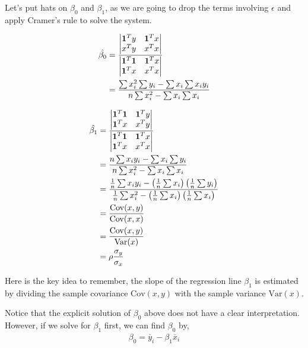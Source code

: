 \documentclass{amsart}
\theoremstyle{plain}
\numberwithin{equation}{section}
\begin{document}
Let's put hats on $\beta_0$ and 
$\beta_1$, as we are going to drop the 
terms involving $\epsilon$ and apply 
Cramer's rule to solve the system.

\begin{align*}
\hat{\beta_0} &= \frac{
\left|
\begin{matrix}
{\bf 1}^Ty & {\bf 1}^Tx\\
x^Ty & x^Tx
\end{matrix}
\right|}
{
\left|
\begin{matrix}
{\bf 1}^T{\bf 1} & {\bf 1}^Tx\\
{\bf 1}^Tx & x^Tx
\end{matrix}
\right|}\\
&=\frac{\sum{x_i^2}\sum{y_i}-\sum{x_i}\sum{x_i y_i}}{n\sum{x_i^2}-\sum{x_i}\sum{x_i}}
\end{align*}

\begin{align*}
\hat{\beta_1} &= \frac{
\left|
\begin{matrix}
{\bf 1}^T{\bf 1} & {\bf 1}^Ty\\
{\bf 1}^Tx & x^Ty
\end{matrix}
\right|}
{
\left|
\begin{matrix}
{\bf 1}^T{\bf 1} & {\bf 1}^Tx\\
{\bf 1}^Tx & x^Tx
\end{matrix}
\right|}\\ 
& = \frac{n \sum{x_i y_i} - \sum{x_i}\sum{y_i}}
{n\sum{x_i^2}-\sum{x_i}\sum{x_i}}\\
& = \frac{ \frac{1}{n}\sum{x_i y_i} - 
\left(\frac{1}{n}\sum{x_i}\right)\left(\frac{1}{n}\sum{y_i}\right)}
{\frac{1}{n}\sum{x_i^2}-
\left(\frac{1}{n}\sum{x_i}\right)\left(\frac{1}{n}\sum{x_i}\right)}\\
& = \frac{\mathrm{Cov}(x, y)}{\mathrm{Cov}(x, x)}\\
& = \frac{\mathrm{Cov}(x, y)}{\mathrm{Var}(x)}\\
& = \rho \frac{\sigma_y}{\sigma_x}
\end{align*}

Here is the key idea to remember, the slope of the regression line $\beta_1$ 
is estimated by dividing the sample covariance $\mathrm{Cov}(x,y)$ with the 
sample variance $\mathrm{Var}(x)$.

Notice that the explicit solution of $\beta_0$ above does not 
have a clear interpretation. However, if we solve for $\beta_1$ first, 
we can find $\beta_0$ by,
\begin{align*}
\beta_0 = \overline{y}_i - \beta_1 \overline{x}_i
\end{align*}
\end{document}
